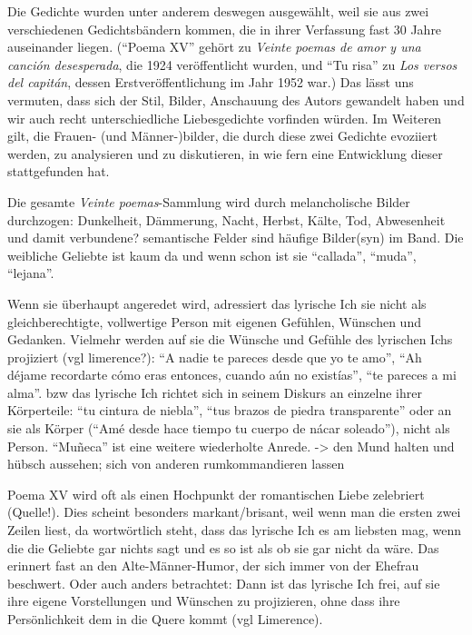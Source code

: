 Die Gedichte wurden unter anderem deswegen ausgewählt, weil sie aus zwei verschiedenen Gedichtsbändern kommen, die in ihrer Verfassung fast 30 Jahre auseinander liegen.
(``Poema XV'' gehört zu \textit{Veinte poemas de amor y una canción desesperada}, die 1924 veröffentlicht wurden, und ``Tu risa'' zu \textit{Los versos del capitán}, dessen Erstveröffentlichung im Jahr 1952 war.)
Das lässt uns vermuten, dass sich der Stil, Bilder, Anschauung des Autors gewandelt haben und wir auch recht unterschiedliche Liebesgedichte vorfinden würden.
Im Weiteren gilt, die Frauen- (und Männer-)bilder, die durch diese zwei Gedichte evoziiert werden, zu analysieren und zu diskutieren, in wie fern eine Entwicklung dieser stattgefunden hat.

Die gesamte \textit{Veinte poemas}-Sammlung wird durch melancholische Bilder durchzogen:
Dunkelheit, Dämmerung, Nacht, Herbst, Kälte, Tod, Abwesenheit und damit verbundene? semantische Felder sind häufige Bilder(syn) im Band.
Die weibliche Geliebte ist kaum da und wenn schon ist sie ``callada'', ``muda'', ``lejana''.

Wenn sie überhaupt angeredet wird, adressiert das lyrische Ich sie nicht als gleichberechtigte, vollwertige Person mit eigenen Gefühlen, Wünschen und Gedanken.
Vielmehr werden auf sie die Wünsche und Gefühle des lyrischen Ichs projiziert (vgl limerence?):
``A nadie te pareces desde que yo te amo'', ``Ah déjame recordarte cómo eras entonces, cuando aún no existías'', ``te pareces a mi alma''.
bzw das lyrische Ich richtet sich in seinem Diskurs an einzelne ihrer Körperteile: ``tu cintura de niebla'', ``tus brazos de piedra transparente'' oder an sie als Körper (``Amé desde hace tiempo tu cuerpo de nácar soleado''), nicht als Person.
``Muñeca'' ist eine weitere wiederholte Anrede. -> den Mund halten und hübsch aussehen; sich von anderen rumkommandieren lassen

Poema XV wird oft als einen Hochpunkt der romantischen Liebe zelebriert (Quelle!).
Dies scheint besonders markant/brisant, weil wenn man die ersten zwei Zeilen liest, da wortwörtlich steht, dass das lyrische Ich es am liebsten mag, wenn die die Geliebte gar nichts sagt und es so ist als ob sie gar nicht da wäre.
Das erinnert fast an den Alte-Männer-Humor, der sich immer von der Ehefrau beschwert.
Oder auch anders betrachtet: Dann ist das lyrische Ich frei, auf sie ihre eigene Vorstellungen und Wünschen zu projizieren, ohne dass ihre Persönlichkeit dem in die Quere kommt (vgl Limerence).


